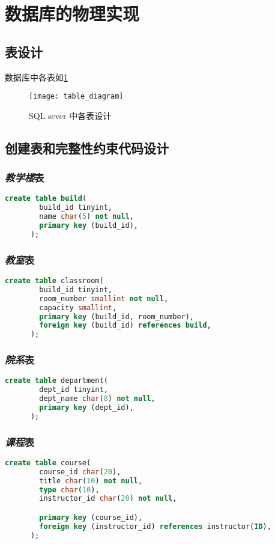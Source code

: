 \documentclass{myreport}
\begin{document}
\section{数据库的物理实现}
  \subsection{表设计}
    数据库中各表如\cref{fig:table_diagram}
    \begin{figure}[H]
      \centering
      \texttt{[image: table\_diagram]}
      \caption{SQL sever 中各表设计}
      \label{fig:table_diagram}
    \end{figure}

  \subsection{创建表和完整性约束代码设计}
    \subsubsection{\emph{教学楼}表}
    \begin{lstlisting}[language=sql]
      create table build(
        build_id tinyint,
        name char(5) not null,
        primary key (build_id),
      );
    \end{lstlisting}

    \subsubsection{\emph{教室}表}
    \begin{lstlisting}[language=sql]
      create table classroom(
        build_id tinyint,
        room_number smallint not null,
        capacity smallint,
        primary key (build_id, room_number),
        foreign key (build_id) references build,
      );
    \end{lstlisting}

    \subsubsection{\emph{院系}表}
    \begin{lstlisting}[language=sql]
      create table department(
        dept_id tinyint,
        dept_name char(8) not null,
        primary key (dept_id),
      );
    \end{lstlisting}

    \subsubsection{\emph{课程}表}
    \begin{lstlisting}[language=sql]
      create table course(
        course_id char(20),
        title char(10) not null,
        type char(10),
        instructor_id char(20) not null,

        primary key (course_id),
        foreign key (instructor_id) references instructor(ID),
      );
    \end{lstlisting}
\end{document}
